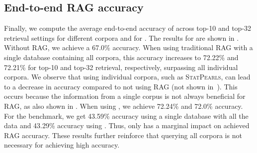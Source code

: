 \subsection{End-to-end \ac{RAG} accuracy}
\label{sec:exp_accuracy}
Finally, we compute the average end-to-end accuracy of \mirage across top-10 and top-32 retrieval settings for different corpora and for \mmlu.
The results for \mirage are shown in .
Without \ac{RAG}, we achieve a 67.0\% accuracy.
When using traditional \ac{RAG} with a single database containing all corpora, this accuracy increases to 72.22\% and 72.21\% for top-10 and top-32 retrieval, respectively, surpassing all individual corpora.
We observe that using individual corpora, such as \textsc{StatPearls}, can lead to a decrease in accuracy compared to not using \ac{RAG} (not shown in~). 
This occurs because the information from a single corpus is not always beneficial for \ac{RAG}, as also shown in .
When using \sys, we achieve 72.24\% and 72.0\% accuracy.
For the \mmlu benchmark, we get 43.59\% accuracy using a single database with all the data and 43.29\% accuracy using \sys.
Thus, \sys only has a marginal impact on achieved \ac{RAG} accuracy.
These results further reinforce that querying all corpora is not necessary for achieving high accuracy.
















